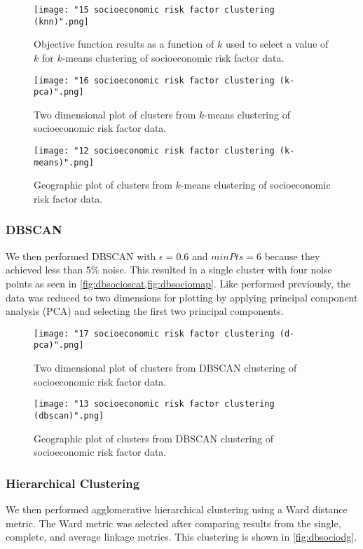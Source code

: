 \documentclass{article}
\begin{document}
\begin{figure}[h]
\centering
\caption{Objective function results as a function of $k$ used to select a value of $k$ for $k$-means clustering of socioeconomic risk factor data.}
\texttt{[image: "15 socioeconomic risk factor clustering (knn)".png]}
\label{fig:kmeanssocioselect}
\end{figure}

\begin{figure}[h]
\centering
\caption{Two dimensional plot of clusters from $k$-means clustering of socioeconomic risk factor data.}
\texttt{[image: "16 socioeconomic risk factor clustering (k-pca)".png]}
\label{fig:kmeanssocioscat}
\end{figure}

\begin{figure}[h]
\centering
\caption{Geographic plot of clusters from $k$-means clustering of socioeconomic risk factor data.}
\texttt{[image: "12 socioeconomic risk factor clustering (k-means)".png]}
\label{fig:kmeanssociomap}
\end{figure}

\subsubsection{DBSCAN}
We then performed DBSCAN with $\epsilon = 0.6$ and $minPts = 6$ because they achieved less than $5\%$ noise. This resulted in a single cluster with four noise points as seen in \cref{fig:dbsocioscat,fig:dbsociomap}. Like performed previously, the data was reduced to two dimensions for plotting by applying principal component analysis (PCA) and selecting the first two principal components.

\begin{figure}[h]
\centering
\caption{Two dimensional plot of clusters from DBSCAN clustering of socioeconomic risk factor data.}
\texttt{[image: "17 socioeconomic risk factor clustering (d-pca)".png]}
\label{fig:dbsocioscat}
\end{figure}

\begin{figure}[h]
\centering
\caption{Geographic plot of clusters from DBSCAN clustering of socioeconomic risk factor data.}
\texttt{[image: "13 socioeconomic risk factor clustering (dbscan)".png]}
\label{fig:dbsociomap}
\end{figure}

\subsubsection{Hierarchical Clustering}
We then performed agglomerative hierarchical clustering using a Ward distance metric. The Ward metric was selected after comparing results from the single, complete, and average linkage metrics. This clustering is shown in \cref{fig:dbsociodg}.
\end{document}
